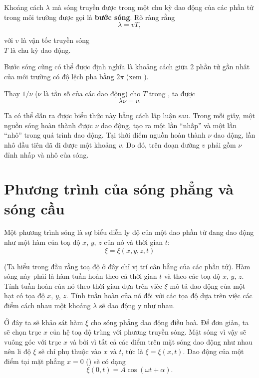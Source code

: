 Khoảng cách $\lambda$ mà sóng truyền được trong một chu kỳ dao động của các phần tử trong môi trường được gọi là \textbf{bước sóng}. Rõ ràng rằng
\begin{equation}\label{eq:14_1}
    \lambda = vT,
\end{equation}

\noindent
với $v$ là vận tốc truyền sóng \\
\indent $T$ là chu kỳ dao động.

Bước sóng cũng có thể được định nghĩa là khoảng cách giữa 2 phần tử gần nhât của môi trường có độ lệch pha bằng $2\pi$ (xem ).

Thay $1/\nu$ ($\nu$ là tần số của các dao động) cho $T$ trong , ta được
\begin{equation}\label{eq:14_2}
    \lambda\nu = v.
\end{equation}

\noindent
Ta có thể dẫn ra được biểu thức này bằng cách lâp luận sau. Trong mỗi giây, một nguồn sóng hoàn thành được $\nu$ dao động, tạo ra một lần ``nhấp'' và một lần ``nhô'' trong quá trình dao động. Tại thời điểm nguồn hoàn thành $\nu$ dao động, lần nhô đầu tiên đã đi được một khoảng $v$. Do đó, trên đoạn đường $v$ phải gồm $\nu$ đỉnh nhấp và nhô của sóng.

\section{Phương trình của sóng phẳng và sóng cầu}\label{sec:14_2}

Một phương trình sóng là sự biểu diễn ly độ của một dao phần tử đang dao động như một hàm của toạ độ $x$, $y$, $z$ của nó và thời gian $t$:
\begin{equation}\label{eq:14_3}
    \xi = \xi(x,y,z,t)
\end{equation}

\noindent
(Ta hiểu trong đầu rằng toạ độ ở đây chỉ vị trí cân bằng của các phần tử). Hàm sóng này phải là hàm tuần hoàn theo cả thời gian $t$ và theo các toạ độ $x$, $y$, $z$. Tính tuần hoàn của nó theo thời gian dựa trên viêc $\xi$ mô tả dao động của một hạt có tọa độ $x$, $y$, $z$. Tính tuần hoàn của nó đối với các tọa độ dựa trên việc các điểm cách nhau một khoảng $\lambda$ sẽ dao động y như nhau.

Ở đây ta sẽ khảo sát hàm $\xi$ cho sóng phẳng dao động điều hoà. Để đơn giản, ta sẽ chọn trục $x$ của hệ toạ độ trùng với phương truyền sóng. Mặt sóng vì vậy sẽ vuông góc với trục $x$ và bởi vì tất cả các điểm trên mặt sóng dao động như nhau nên li độ $\xi$ sẽ chỉ phụ thuộc vào $x$ và $t$, tức là $\xi=\xi(x,t)$. Dao động của một điểm tại mặt phẳng $x=0$ () sẽ có dạng
\begin{equation*}
    \xi(0,t) = A \cos(\omega t + \alpha).
\end{equation*}

